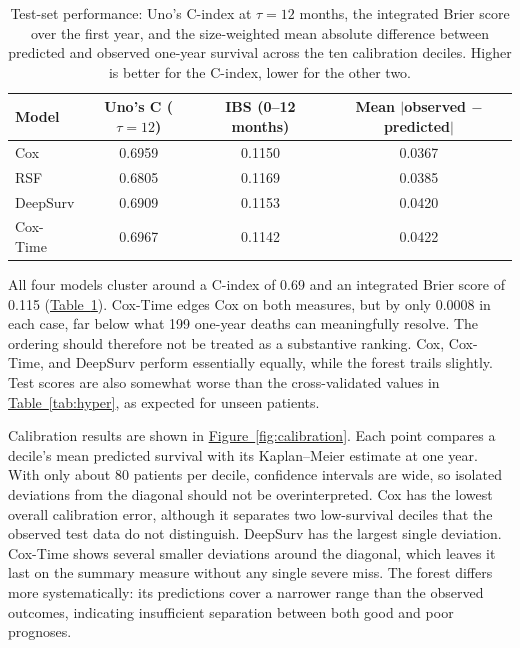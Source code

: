 \documentclass[11pt,a4paper]{article}
\newcommand{\tabref}[1]{\hyperref[#1]{Table~\ref*{#1}}}
\newcommand{\figref}[1]{\hyperref[#1]{Figure~\ref*{#1}}}
\begin{document}
\setcounter{table}{9}   %
\begin{table}[H]
\centering
\caption{Test-set performance: Uno's C-index at $\tau = 12$ months, the
integrated Brier score over the first year, and the size-weighted mean absolute difference
between predicted and observed one-year survival across the ten calibration deciles. Higher
is better for the C-index, lower for the other two.}
\label{tab:testperf}
\vspace{0.3em}
\small
\begin{tabular}{lccc}
\toprule
Model & Uno's C ($\tau = 12$) & IBS (0--12 months) & Mean $|$observed $-$ predicted$|$ \\
\midrule
Cox      & 0.6959 & 0.1150 & 0.0367 \\
RSF      & 0.6805 & 0.1169 & 0.0385 \\
DeepSurv & 0.6909 & 0.1153 & 0.0420 \\
Cox-Time & 0.6967 & 0.1142 & 0.0422 \\
\bottomrule
\end{tabular}
\end{table}

All four models cluster around a C-index of 0.69 and an integrated Brier score of 0.115 (\tabref{tab:testperf}). Cox-Time edges Cox on both measures, but by only 0.0008 in each case, far below what 199 one-year deaths can meaningfully resolve. The ordering should therefore not be treated as a substantive ranking. Cox, Cox-Time, and DeepSurv perform essentially equally, while the forest trails slightly. Test scores are also somewhat worse than the cross-validated values in \tabref{tab:hyper}, as expected for unseen patients.

Calibration results are shown in \figref{fig:calibration}. Each point compares a decile's mean predicted survival with its Kaplan--Meier estimate at one year. With only about 80 patients per decile, confidence intervals are wide, so isolated deviations from the diagonal should not be overinterpreted. Cox has the lowest overall calibration error, although it separates two low-survival deciles that the observed test data do not distinguish. DeepSurv has the largest single deviation. Cox-Time shows several smaller deviations around the diagonal, which leaves it last on the summary measure without any single severe miss. The forest differs more systematically: its predictions cover a narrower range than the observed outcomes, indicating insufficient separation between both good and poor prognoses.
\end{document}
